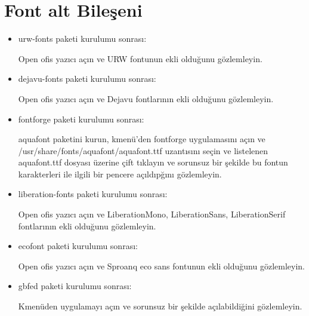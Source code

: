 \documentclass[a4paper,10pt]{article}
\begin{document}
\section{Font alt Bileşeni}
\begin{itemize}

\item  urw-fonts paketi kurulumu sonrası:

Open ofis yazıcı açın ve URW fontunun ekli olduğunu gözlemleyin.


\item  dejavu-fonts paketi kurulumu sonrası:

Open ofis yazıcı açın ve Dejavu fontlarının ekli olduğunu gözlemleyin.
 \item fontforge paketi kurulumu sonrası:

aquafont paketini kurun, kmenü'den fontforge uygulamasını açın ve /usr/share/fonts/aquafont/aquafont.ttf uzantısını seçin ve listelenen aquafont.ttf  dosyası üzerine çift tıklayın ve sorunsuz bir şekilde bu fontun karakterleri ile ilgili bir pencere açıldıpğını gözlemleyin.
\item liberation-fonts paketi kurulumu sonrası:

Open ofis yazıcı açın ve LiberationMono, LiberationSans, LiberationSerif fontlarının ekli olduğunu gözlemleyin.

\item ecofont paketi kurulumu sonrası:

Open ofis yazıcı açın ve Sproanq eco sans fontunun ekli olduğunu gözlemleyin.
\item gbfed paketi kurulumu sonrası:

Kmenüden uygulamayı açın ve sorunsuz bir şekilde açılabildiğini gözlemleyin.
\end{itemize}
\end{document}
